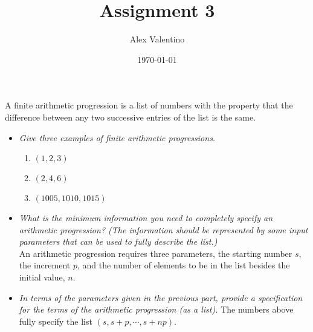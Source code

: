 \documentclass[12pt, letterpaper]{article}
\date{\today}
\author{Alex Valentino}
\title{Assignment 3}
\begin{document}
	{A finite arithmetic progression is a list of numbers with the property that the difference
between any two successive entries of the list is the same.}
	\begin{itemize}
		\item \textit{Give three examples of finite arithmetic progressions.}
		\begin{enumerate}
			\item $(1,2,3)$
			\item $(2,4,6)$
			\item $(1005, 1010, 1015)$
		\end{enumerate}
		\item \textit{What is the minimum information you need to completely specify an arithmetic progression? (The information should be represented by some input parameters that can
be used to fully describe the list.)}\\
		An arithmetic progression requires three parameters, the starting number $s$, the increment $p$, and the number of elements to be in the list besides the initial value, $n$.  
		\item \textit{In terms of the parameters given in the previous part, provide a specification for the
terms of the arithmetic progression (as a list).}
		The numbers above fully specify the list $(s, s + p, \cdots, s+np)$.
	\end{itemize}
\end{document}
